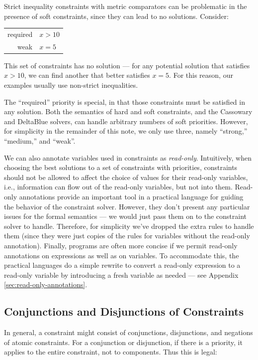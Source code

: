 \documentclass{article}
\newcounter{examples}
\begin{document}
Strict inequality constraints with metric comparators can be
problematic in the presence of soft constraints, since they can lead
to no solutions.  Consider:

\begin{tabular}{rl}
required & $x>10$ \\
weak     & $x=5$
\end{tabular}

This set of constraints has no solution --- for any potential solution
that satisfies $x>10$, we can find another that better satisfies
$x=5$.  For this reason, our examples usually use non-strict
inequalities. 

The ``required'' priority is special, in that those constraints must
be satisfied in any solution.  Both the semantics of hard and soft
constraints, and the Cassowary and DeltaBlue solvers, can handle
arbitrary numbers of soft priorities.  However, for simplicity in the
remainder of this note, we only use three, namely ``strong,''
``medium,'' and ``weak''.

We can also annotate variables used in constraints as
\emph{read-only}.  Intuitively, when choosing the best solutions to a
set of constraints with priorities, constraints should not be allowed
to affect the choice of values for their read-only variables, i.e.,
information can flow out of the read-only variables, but not into
them.  Read-only annotations provide an important tool in a practical
language for guiding the behavior of the constraint solver.  However,
they don't present any particular issues for the formal semantics ---
we would just pass them on to the constraint solver to handle.
Therefore, for simplicity we've dropped the extra rules to handle them
(since they were just copies of the rules for variables without the
read-only annotation).  Finally, programs are often more concise if we
permit read-only annotations on expressions as well as on variables.
To accommodate this, the practical languages do a simple rewrite to
convert a read-only expression to a read-only variable by introducing
a fresh variable as needed --- see Appendix \ref{sec:read-only-annotations}.

\subsection{Conjunctions and Disjunctions of Constraints}

In general, a constraint might consist of conjunctions, disjunctions,
and negations of atomic constraints.  For a conjunction or
disjunction, if there is a priority, it applies to the entire
constraint, not to components.  Thus this is legal:
\end{document}
